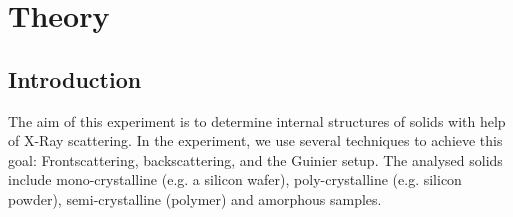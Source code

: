 
\section{Theory}

\subsection{Introduction}
The aim of this experiment is to determine internal structures of solids with help of X-Ray scattering. In the experiment, we use several techniques to achieve this goal: Frontscattering, backscattering, and the Guinier setup. The analysed solids include mono-crystalline (e.g. a silicon wafer), poly-crystalline (e.g. silicon powder), semi-crystalline (polymer) and amorphous samples.

